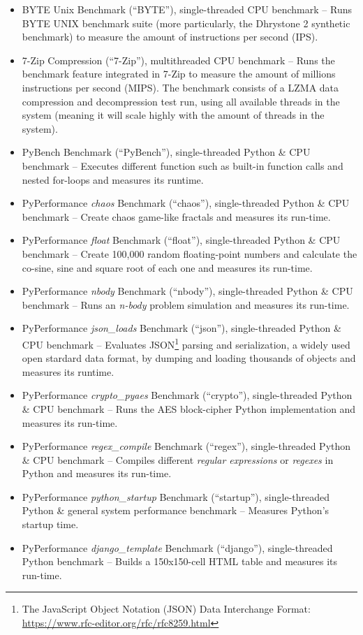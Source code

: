 \begin{itemize}
    \item BYTE Unix Benchmark (``BYTE''), single-threaded CPU benchmark -- Runs BYTE UNIX benchmark suite (more particularly, the Dhrystone 2 synthetic benchmark) to measure the amount of instructions per second (IPS). 
    \item 7-Zip Compression (``7-Zip''), multithreaded CPU benchmark -- Runs the benchmark feature integrated in 7-Zip to measure the amount of millions instructions per second (MIPS). The benchmark consists of a LZMA data compression and decompression test run, using all available threads in the system (meaning it will scale highly with the amount of threads in the system). 
    \item PyBench Benchmark (``PyBench''), single-threaded Python \& CPU benchmark -- Executes different function such as built-in function calls and nested for-loops and measures its runtime.
    \item PyPerformance \textit{chaos} Benchmark (``chaos''), single-threaded Python \& CPU benchmark -- Create chaos game-like fractals \cite{Jeffrey1992} and measures its run-time. 
    \item PyPerformance \textit{float} Benchmark (``float''), single-threaded Python \& CPU benchmark -- Create 100,000 random floating-point numbers and calculate the co-sine, sine and square root of each one and measures its run-time.
    \item PyPerformance \textit{nbody} Benchmark (``nbody''), single-threaded Python \& CPU benchmark -- Runs an \textit{n-body} problem simulation \cite{Playne2009} and measures its run-time.
    \item PyPerformance \textit{json\_loads} Benchmark (``json''), single-threaded Python \& CPU benchmark -- Evaluates \acf{JSON}\footnote{The JavaScript Object Notation (JSON) Data Interchange Format: \url{https://www.rfc-editor.org/rfc/rfc8259.html}} parsing and serialization, a widely used open stardard data format, by dumping and loading thousands of objects and measures its runtime.
    \item PyPerformance \textit{crypto\_pyaes} Benchmark (``crypto''), single-threaded Python \& CPU benchmark -- Runs the AES block-cipher Python implementation and measures its run-time.
    \item PyPerformance \textit{regex\_compile} Benchmark (``regex''), single-threaded Python \& CPU benchmark -- Compiles different \textit{regular expressions} or \textit{regexes} in Python and measures its run-time.
    \item PyPerformance \textit{python\_startup} Benchmark (``startup''), single-threaded Python \& general system performance benchmark -- Measures Python's startup time.
    \item PyPerformance \textit{django\_template} Benchmark (``django''), single-threaded Python benchmark -- Builds a 150x150-cell HTML table and measures its run-time.
\end{itemize}

